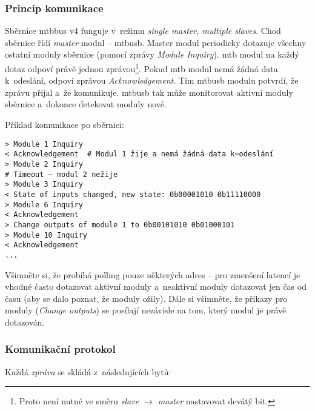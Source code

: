 \subsubsection{Princip komunikace}

Sběrnice \gls{mtbbus} v4 funguje v~režimu \textit{single master, multiple
slaves}. Chod sběrnice řídí \textit{master} modul – \gls{mtbusb}.
Master modul periodicky dotazuje všechny ostatní moduly sběrnice (pomocí zprávy
\textit{Module Inquiry}). \gls{mtb} modul na každý dotaz odpoví právě jednou
zprávou\footnote{Proto není nutné ve směru \textit{slave $\rightarrow$ master}
nastavovat devátý bit.}.  Pokud \gls{mtb} modul nemá žádná data k~odeslání,
odpoví zprávou \textit{Acknowledgement}. Tím \gls{mtbusb} modulu potvrdí, že
zprávu přijal a~že komunikuje. \gls{mtbusb} tak může monitorovat aktivní moduly
sběrnice a~dokonce detekovat moduly nové.

Příklad komunikace po sběrnici:

\begin{verbatim}
> Module 1 Inquiry
< Acknowledgement  # Modul 1 žije a nemá žádná data k~odeslání
> Module 2 Inquiry
# Timeout – modul 2 nežije
> Module 3 Inquiry
< State of inputs changed, new state: 0b00001010 0b11110000
> Module 6 Inquiry
< Acknowledgement
> Change outputs of module 1 to 0b00101010 0b01000101
> Module 10 Inquiry
< Acknowledgement
...
\end{verbatim}

Všimněte si, že probíhá polling pouze některých adres – pro zmenšení latencí je
vhodné často dotazovat aktivní moduly a~neaktivní moduly dotazovat jen čas od
času (aby se dalo poznat, že moduly ožily). Dále si všimněte, že příkazy pro
moduly (\textit{Change outputs}) se posílají nezávisle na tom, který modul je
právě dotazován.

\subsubsection{Komunikační protokol} \label{subsub:mtbbus-proto-strucure}

Každá \textit{zpráva} se skládá z~následujících bytů:


